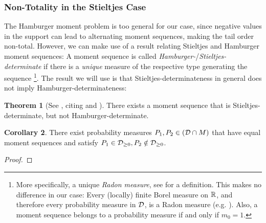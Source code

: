 \documentclass[a4paper,DIV=11]{scrreprt}
\theoremstyle{definition}
\newtheorem{thm}{Theorem}[chapter] %
\newtheorem{cor}[thm]{Corollary}
\begin{document}
    \subsubsection{Non-Totality in the Stieltjes Case}
    The Hamburger moment problem is too general for our case, since negative values in the support can lead to alternating moment sequences, making the tail order non-total.
    However, we can make use of a result relating Stieltjes and Hamburger moment sequences:
    A moment sequence is called \emph{Hamburger-}/\emph{Stieltjes-determinate} if there is a \emph{unique} measure of the respective type generating the sequence \cite[p.68]{bib:schmuedgenTheMomentProblem}
    \footnote{More specifically, a unique \emph{Radon measure}, see \cite[A.1]{bib:schmuedgenTheMomentProblem} for a definition. This makes no difference in our case: Every (locally) finite Borel measure on $\mathbb{R}$, and therefore every probability measure in $\mathcal{D}$, is a Radon measure (e.g. \cite[Proposition II.3.1]{bib:malliavinIntegrationAndProbability}). Also, a moment sequence belongs to a probability measure if and only if $m_0 = 1$.}.
    The result we will use is that Stieltjes-determinateness in general does not imply Hamburger-determinateness:
    
    \begin{thm}[See {\cite[Fact A]{bib:linMomentProblemRecentDevelopments}}, citing {\cite[p.240]{bib:akhiezerClassicalMomentProblem}} and \cite{bib:chiharaIndeterminateHamburgerMomentProblems}]
        There exists a moment sequence that is Stieltjes-determinate, but not Hamburger-determinate.
    \end{thm}

    \begin{cor}
        There exist probability measures $P_1, P_2 \in (\mathcal{D} \cap M)$ that have equal moment sequences and satisfy $P_1 \in \mathcal{D}_{\geq0}, P_2 \notin \mathcal{D}_{\geq0}$.
        \label{cor:equalMomentSequencesStieltjesHamburger}
    \end{cor}
    \begin{proof}
        \sloppypar{
        Let $(m_n)_{n \geq 0}$ be a moment sequence which is Stieltjes-determinate, but not Hamburger-determinate.
        Let $\mu_1$ be the unique measure in $\Dgeqzero$ with that moment sequence.
        Let $\mu_2 \neq \mu_1$ be a different measure with that moment sequence, which exists since the sequence is not Hamburger-determinate. 
        Since $\mu_1$ is unique in the Stieltjes sense, the support of $\mu_2$ must overlap with $(-\infty, 0)$.
        If $m_0 \neq 1$, the measures constructed are not probability measures: 
        We normalize them and define $P_1 = \frac{1}{m_0}\mu_1, P_2 = \frac{1}{m_0}\mu_2$, which are probability measures which both have the moment sequence $(\frac{m_n}{m_0})_{n \geq 0}$.
    }
    \end{proof}
    
\end{document}
